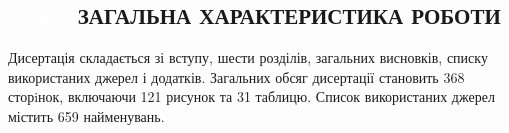 

\begin{center}
\section*{
\textcolor{white}{[1--25]}
\MakeUppercase{Загальна характеристика роботи}
\textcolor{white}
{\cite{Olikh2018JAP,Olikh2018SM,Olikh:Ultras2016,Olikh2016JSem,
Olikh:Rev,OlikhJAP,Olikh:Ultras,Olikh:UPJ2014,
Olikh:2013IEEE,Olikh:SEMT2013,Olikh:FTP2013,Olikh:UPJ2013,
Olikh:FTP2011,Olikh:SEMT2011,Olikh:UPJ2010,Gorb2010,Olikh:FTP2009,
Olikh:SEMT2007,Olikh:MRS2007a,Olikh:PZTF2006,
Olikh:PhChOM2005,Olikh:PJE2004,Olikh:SEMT2004,Olikh:SPQEO2003,
Olikh:Visn2003,
1UNCPS,3Tomsk,1SEMST,50IUFFC,9APTTE,2005IUS,ICU2007SC,ICU2007GA,2007MRS,3UNCPS,6DrogGorb,6Drog,
4UNCPS,2009DRIP13,4Kremen,7Drog,5UNCPS,2012Ternop,14Plivk,8Drog,2013Buk,6UNCPS,2014IUSOl,2014IUS,6SEMST,
2015ICU,6CPFCS,7UNCPS,2017MEICS}}
}
\end{center}




{\structureTXT}
Дисертація складається зі вступу, шести розділів, загальних висновків, списку використаних джерел і додатків.
Загальних обсяг дисертації становить
368 сторiнок, включаючи 121 рисунок та 31 таблицю.
Список використаних джерел містить 659 найменувань.

